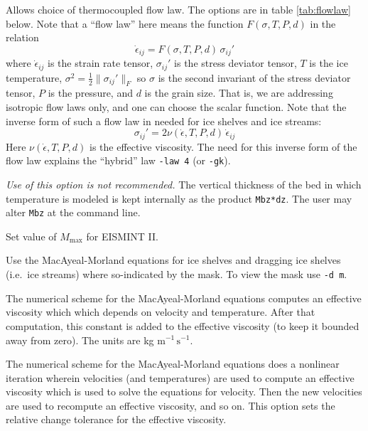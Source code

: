 \documentclass[11pt,final]{amsart}
\newcommand{\eps}{\epsilon}
\begin{document}
  Allows choice of thermocoupled flow law.  The options are in table \ref{tab:flowlaw} below.  Note that a ``flow law'' here means the function $F(\sigma,T,P,d)$ in the relation
	$$\dot \eps_{ij} = F(\sigma,T,P,d)\, \sigma_{ij}'$$
where $\dot \eps_{ij}$ is the strain rate tensor, $\sigma_{ij}'$ is the stress deviator tensor, $T$ is the ice temperature, $\sigma^2 = \frac{1}{2} \|\sigma_{ij}'\|_F$ so $\sigma$ is the second invariant of the stress deviator tensor, $P$ is the pressure, and $d$ is the grain size.  That is, we are addressing isotropic flow laws only, and one can choose the scalar function.  Note that the inverse form of such a flow law in needed for ice shelves and ice streams:
	$$\sigma_{ij}' = 2 \nu(\dot\eps,T,P,d)\,\dot \eps_{ij} $$
Here $\nu(\dot \eps,T,P,d)$ is the effective viscosity.  The need for this inverse form of the flow law explains the ``hybrid'' law \verb|-law 4| (or \verb|-gk|).


  \emph{Use of this option is not recommended.}  The vertical thickness of the bed in which temperature is modeled is kept internally as the product \verb|Mbz*dz|.  The user may alter \verb|Mbz| at the command line.






  Set value of $M_{\text{max}}$ for EISMINT II.

  Use the MacAyeal-Morland equations for ice shelves and dragging ice shelves (i.e.~ice streams) where so-indicated by the mask.  To view the mask use \verb|-d m|.

  The numerical scheme for the MacAyeal-Morland equations computes an effective viscosity which which depends on velocity and temperature.  After that computation, this constant is added to the effective viscosity (to keep it bounded away from zero).  The units are kg $\text{m}^{-1}\,\text{s}^{-1}$.

  The numerical scheme for the MacAyeal-Morland equations does a nonlinear iteration wherein velocities (and temperatures) are used to compute an effective viscosity which is used to solve the equations for velocity.  Then the new velocities are used to recompute an effective viscosity, and so on.  This option sets the relative change tolerance for the effective viscosity.
\end{document}
